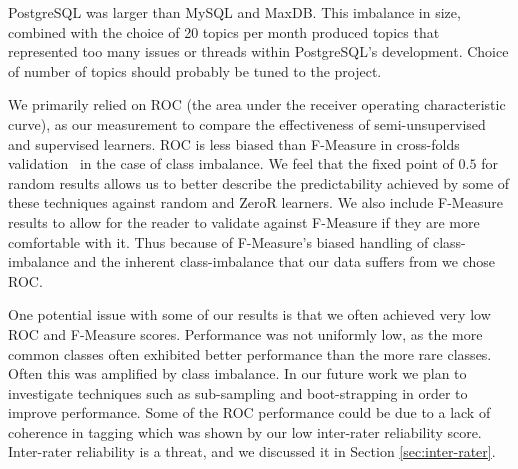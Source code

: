\documentclass[smallextended]{svjour3}       %
\begin{document}
PostgreSQL was larger than MySQL and MaxDB. This imbalance in size,
combined with the choice of 20 topics per month produced topics that
represented too many issues or threads within PostgreSQL's
development. Choice of number of topics should probably be tuned to
the project.

We primarily relied on ROC (the area under the receiver operating
characteristic curve), as our measurement to compare the effectiveness
of semi-unsupervised and supervised learners. ROC is less biased than
F-Measure in cross-folds
validation~\cite{flach-icml03,Forman:2010:ACS:1882471.1882479} in the
case of class imbalance. We
feel that the fixed point of $0.5$ for random results allows us to
better describe the predictability achieved by some of these
techniques against random and ZeroR learners. 
We also include
F-Measure results to allow for the reader to validate against
F-Measure if they are more comfortable with it. Thus because of
F-Measure's biased handling of class-imbalance and the inherent
class-imbalance that our data suffers from we chose ROC.

One potential issue with some of our results is that we often achieved very
low ROC and F-Measure scores.  Performance was not uniformly low,
as the more common classes often exhibited better performance than the
more rare classes.  Often this was amplified by class imbalance. In
our future work we plan to investigate techniques such as sub-sampling and
boot-strapping in order to improve performance. Some of the ROC
performance could be due to a lack of coherence in tagging which was
shown by our low inter-rater reliability score. Inter-rater reliability is a threat, and we discussed it in Section \ref{sec:inter-rater}. 
\end{document}
